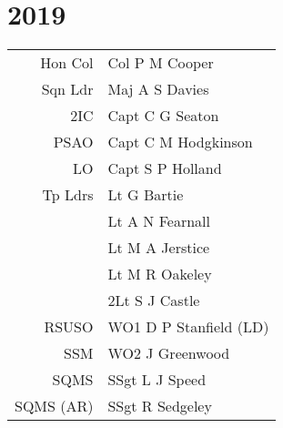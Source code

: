 \chapter*{2019}

\vspace*{10mm}

\begin{center}
  \small
  \begin{tabular}{rl}
    Hon Col & Col P M Cooper \\
    Sqn Ldr & Maj A S Davies \\
    2IC & Capt C G Seaton \\
    PSAO & Capt C M Hodgkinson \\
    LO & Capt S P Holland \\
    Tp Ldrs & Lt G Bartie \\
     & Lt A N Fearnall \\
     & Lt M A Jerstice \\
     & Lt M R Oakeley \\
     & 2Lt S J Castle \\
    RSUSO & WO1 D P Stanfield (LD) \\
    SSM & WO2 J Greenwood \\
    SQMS & SSgt L J Speed \\
    SQMS (AR) & SSgt R Sedgeley \\
  \end{tabular}
\end{center}

\vspace*{5mm}


